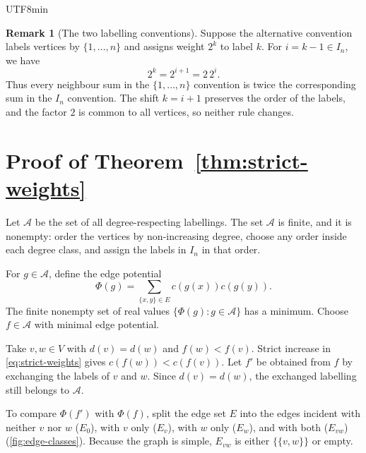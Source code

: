 \documentclass[reqno]{amsart}
\theoremstyle{definition}
\newtheorem{remark}[theorem]{Remark}
\numberwithin{equation}{section}
\begin{document}
\begin{CJK*}{UTF8}{min}
\begin{remark}[The two labelling conventions]\label{rem:conventions}
Suppose the alternative convention labels vertices by
\(\{1,\ldots,n\}\) and assigns weight \(2^k\) to label \(k\). For
\(i=k-1\in I_n\), we have
\[
  2^k=2^{i+1}=2\,2^i.
\]
Thus every neighbour sum in the \(\{1,\ldots,n\}\) convention is twice the
corresponding sum in the \(I_n\) convention. The shift \(k=i+1\) preserves the
order of the labels, and the factor \(2\) is common to all vertices, so neither
rule changes.
\end{remark}

\section{Proof of Theorem~\ref{thm:strict-weights}}\label{sec:proof}

Let \(\mathcal A\) be the set of all degree-respecting labellings. The set
\(\mathcal A\) is finite, and it is nonempty: order the vertices by non-increasing degree, choose any order inside each
degree class, and assign the labels in \(I_n\) in that order.

For \(g\in\mathcal A\), define the edge potential
\begin{equation}
  \Phi(g)=\sum_{\{x,y\}\in E}c(g(x))c(g(y)).
  \label{eq:potential}
\end{equation}
The finite nonempty set of real values \(\{\Phi(g):g\in\mathcal A\}\) has a
minimum. Choose \(f\in\mathcal A\) with minimal edge potential.

Take \(v,w\in V\) with \(d(v)=d(w)\) and \(f(w)<f(v)\). Strict increase in
\eqref{eq:strict-weights} gives \(c(f(w))<c(f(v))\). Let \(f'\) be obtained from
\(f\) by exchanging the labels of \(v\) and \(w\). Since
\(d(v)=d(w)\), the exchanged labelling still belongs to \(\mathcal A\).

To compare \(\Phi(f')\) with \(\Phi(f)\), split the edge set \(E\) into the
edges incident with neither \(v\) nor \(w\) (\(E_0\)), with \(v\) only
(\(E_v\)), with \(w\) only (\(E_w\)), and with both (\(E_{vw}\))
(\cref{fig:edge-classes}). Because the graph is simple,
\(E_{vw}\) is either \(\{\{v,w\}\}\) or empty.


\end{CJK*}
\end{document}
